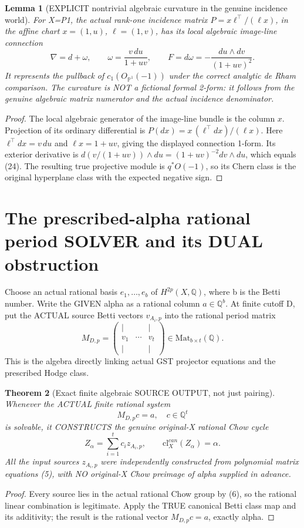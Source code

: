 \documentclass[11pt]{article}
\newtheorem{theorem}{Theorem}[section]
\newtheorem{lemma}[theorem]{Lemma}
\begin{document}
\begin{lemma}[EXPLICIT nontrivial algebraic curvature in the genuine incidence world]
For X=P1, the actual
rank-one incidence matrix
$P=x\ell^\top/(\ell x)$,
in the affine chart
$x=(1,u)$,
$\ell=(1,v)$,
has its local algebraic
image-line connection
\[
  \boxed{\nabla=d+\omega,\qquad
         \omega=\frac{v\,du}{1+uv},\qquad
         F=d\omega=
               -\frac{du\wedge dv}{(1+uv)^2}.}
                                                               \tag{24}
\]
It represents the pullback
of $c_1(O_{\mathbb P^1}(-1))$
under the correct
analytic de Rham comparison.
The curvature is NOT
a fictional formal
2-form: it follows from
the genuine algebraic
matrix numerator and
the actual incidence
denominator.
\end{lemma}
\begin{proof}
The local algebraic
generator of the
image-line bundle is
the column $x$.
Projection of its
ordinary differential is
$P(dx)=x\,(\ell^\top dx)/(\ell x)$.
Here $\ell^\top dx=v\,du$
and $\ell x=1+uv$,
giving the displayed
connection 1-form.
Its exterior derivative is
$d(v/(1+uv))\wedge du
=(1+uv)^{-2}dv\wedge du$,
which equals (24).
The resulting true
projective module is
$q^*O(-1)$, so its
Chern class is the
original hyperplane
class with the expected
negative sign.
\end{proof}

\section{The prescribed-alpha rational period SOLVER and its DUAL obstruction}
Choose an actual rational basis
\(e_1,\ldots,e_b\) of \(H^{2p}(X,\mathbb Q)\),
where b is the Betti number.
Write the GIVEN alpha as a rational column
\(a\in\mathbb Q^b\). At finite cutoff D,
put the ACTUAL source Betti vectors
\(v_{A_i,p}\) into the rational period matrix
\[
 \boxed{M_{D,p}=
  \begin{pmatrix}
   |&&|\\v_1&\cdots&v_t\\|&&|
  \end{pmatrix}
  \in\mathrm{Mat}_{b\times t}(\mathbb Q).}          \tag{10}
\]
This is the algebra directly linking actual GST
projector equations and the prescribed Hodge class.

\begin{theorem}[Exact finite algebraic SOURCE OUTPUT, not just pairing]
Whenever the ACTUAL finite rational system
\[
 \boxed{M_{D,p}c=a,\quad c\in\mathbb Q^t}         \tag{11}
\]
is solvable, it CONSTRUCTS the genuine
original-X rational Chow cycle
\[
 \boxed{Z_\alpha=
        \sum_{i=1}^{t}c_i z_{A_i,p},
 \qquad\mathrm{cl}^{can}_X(Z_\alpha)=\alpha.}     \tag{12}
\]
All the input sources \(z_{A_i,p}\) were
independently constructed from polynomial
matrix equations (5), with NO original-X
Chow preimage of alpha supplied in advance.
\end{theorem}
\begin{proof}
Every source lies in the actual rational Chow
group by (6), so the rational linear combination
is legitimate. Apply the TRUE canonical Betti
class map and its additivity; the result is the
rational vector \(M_{D,p}c=a\), exactly alpha.
\end{proof}
\end{document}
